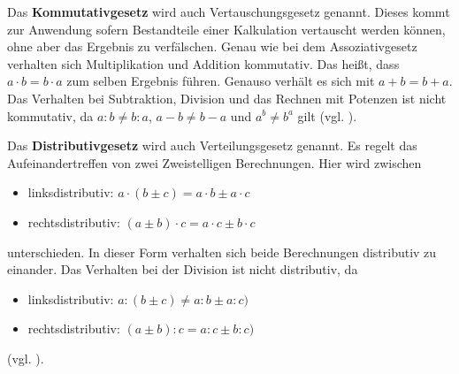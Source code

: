 \documentclass[12pt,a4paper]{article}
\theoremstyle{definition}
\begin{document}
\newpage
Das \textbf{Kommutativgesetz} wird auch Vertauschungsgesetz genannt.
Dieses kommt zur Anwendung sofern Bestandteile einer Kalkulation vertauscht werden können, ohne aber das Ergebnis zu verfälschen.\newline
Genau wie bei dem Assoziativgesetz verhalten sich Multiplikation und Addition kommutativ.
Das heißt, dass $a \cdot b = b \cdot a$ zum selben Ergebnis führen.
Genauso verhält es sich mit $a + b = b + a$.\newline
Das Verhalten bei Subtraktion, Division und das Rechnen mit Potenzen ist nicht kommutativ, da $a : b \neq b : a$, $a - b \neq b - a$ und $a^b \neq b^a$ gilt (vgl. \cite{EncyclopediaofMathematics2014}).

Das \textbf{Distributivgesetz} wird auch Verteilungsgesetz genannt.
Es regelt das Aufeinandertreffen von zwei Zweistelligen Berechnungen.
Hier wird zwischen
\begin{itemize}
    \item linksdistributiv: $a \cdot (b \pm c) = a \cdot b \pm a \cdot c$
    \item rechtsdistributiv: $(a \pm b) \cdot c = a \cdot c \pm b\cdot c$
\end{itemize}
unterschieden.
In dieser Form verhalten sich beide Berechnungen distributiv zu einander.\newline
Das Verhalten bei der Division ist nicht distributiv, da
\begin{itemize}
    \item linksdistributiv: $a : (b \pm c) \neq a :b \pm a : c)$
    \item rechtsdistributiv: $(a \pm b) : c = a :c \pm b : c)$
\end{itemize}
(vgl. \cite{EncyclopediaofMathematics2016}).
\end{document}
